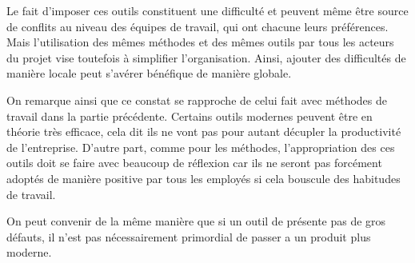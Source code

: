 Le fait d'imposer ces outils constituent une difficulté et peuvent même être source de conflits au niveau des équipes de travail, qui ont chacune leurs préférences. Mais l'utilisation des mêmes méthodes et des mêmes outils par tous les acteurs du projet vise toutefois à simplifier l'organisation. Ainsi, ajouter des difficultés de manière locale peut s'avérer bénéfique de manière globale.

On remarque ainsi que ce constat se rapproche de celui fait avec méthodes de travail dans la partie précédente. Certains outils modernes peuvent être en théorie très efficace, cela dit ils ne vont pas pour autant décupler la productivité de l'entreprise. D'autre part, comme pour les méthodes, l'appropriation des ces outils doit se faire avec beaucoup de réflexion car ils ne seront pas forcément adoptés de manière positive par tous les employés si cela bouscule des habitudes de travail.

On peut convenir de la même manière que si un outil de présente pas de gros défauts, il n'est pas nécessairement primordial de passer a un produit plus moderne.
